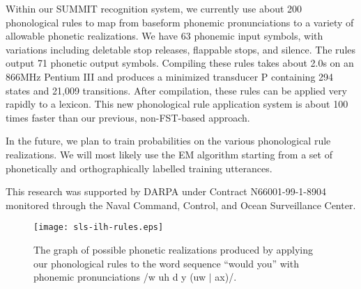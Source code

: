 Within our SUMMIT recognition system, we currently use about 200
phonological rules to map from baseform phonemic pronunciations to a
variety of allowable phonetic realizations.  We have 63 phonemic input
symbols, with variations including deletable stop releases, flappable
stops, and silence.  The rules output 71 phonetic output symbols.
Compiling these rules takes about 2.0s on an 866MHz Pentium III and
produces a minimized transducer P containing 294 states and 21,009
transitions.  After compilation, these rules can be applied very
rapidly to a lexicon.  This new phonological rule application system
is about 100 times faster than our previous, non-FST-based approach.

In the future, we plan to train probabilities on the various
phonological rule realizations.  We will most likely use the EM
algorithm starting from a set of phonetically and orthographically
labelled training utterances.

This research was supported by DARPA under Contract N66001-99-1-8904
monitored through the Naval Command, Control, and Ocean Surveillance
Center.


\begin{figure}
\texttt{[image: sls-ilh-rules.eps]}

\caption{The graph of possible phonetic realizations produced by
	applying our phonological rules to the word sequence
	``would you'' with phonemic pronunciations
	/w uh d y (uw $|$ ax)/.}
\label{sls-ilh-rules-figure}
\end{figure}

%
%
% 

